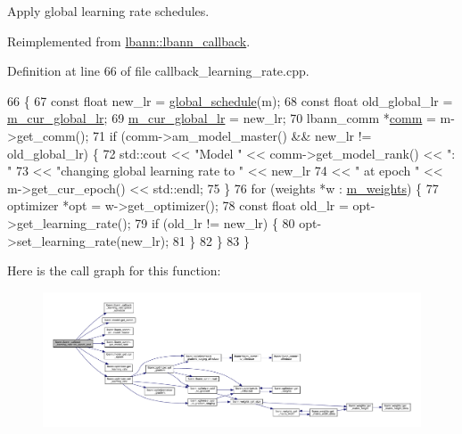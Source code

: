 Apply global learning rate schedules. 

Reimplemented from \hyperlink{classlbann_1_1lbann__callback_a1fc71110e7f754bf73c9e0f344a448a5}{lbann\+::lbann\+\_\+callback}.



Definition at line 66 of file callback\+\_\+learning\+\_\+rate.\+cpp.


\begin{DoxyCode}
66                                                         \{
67   \textcolor{keyword}{const} \textcolor{keywordtype}{float} new\_lr = \hyperlink{classlbann_1_1lbann__callback__learning__rate_a7869b93e5963d6f76da68d8c8137b979}{global\_schedule}(m);
68   \textcolor{keyword}{const} \textcolor{keywordtype}{float} old\_global\_lr = \hyperlink{classlbann_1_1lbann__callback__learning__rate_a97194f282c29a748c915d9811a8a99fb}{m\_cur\_global\_lr};
69   \hyperlink{classlbann_1_1lbann__callback__learning__rate_a97194f282c29a748c915d9811a8a99fb}{m\_cur\_global\_lr} = new\_lr;
70   lbann\_comm *\hyperlink{file__io_8cpp_ab048c6f9fcbcfaa57ce68b00263dbebe}{comm} = m->get\_comm();
71   \textcolor{keywordflow}{if} (comm->am\_model\_master() && new\_lr != old\_global\_lr) \{
72     std::cout << \textcolor{stringliteral}{"Model "} << comm->get\_model\_rank() << \textcolor{stringliteral}{": "}
73               << \textcolor{stringliteral}{"changing global learning rate to "} << new\_lr
74               << \textcolor{stringliteral}{" at epoch "} << m->get\_cur\_epoch() << std::endl;
75   \}
76   \textcolor{keywordflow}{for} (weights *w : \hyperlink{classlbann_1_1lbann__callback__learning__rate_a0b02e82190e04a22ab26d858041915d7}{m\_weights}) \{
77     optimizer *opt = w->get\_optimizer();
78     \textcolor{keyword}{const} \textcolor{keywordtype}{float} old\_lr = opt->get\_learning\_rate();
79     \textcolor{keywordflow}{if} (old\_lr != new\_lr) \{
80       opt->set\_learning\_rate(new\_lr);
81     \}
82   \}
83 \}
\end{DoxyCode}
Here is the call graph for this function\+:\nopagebreak
\begin{figure}[H]
\begin{center}
\leavevmode
\includegraphics[width=350pt]{classlbann_1_1lbann__callback__learning__rate_ab8eb509bdbea501882d6b248a814bb28_cgraph}
\end{center}
\end{figure}
\mbox{\label{classlbann_1_1lbann__callback__learning__rate_a80b82eebf8e38cbe0a484aea43644705}} 
